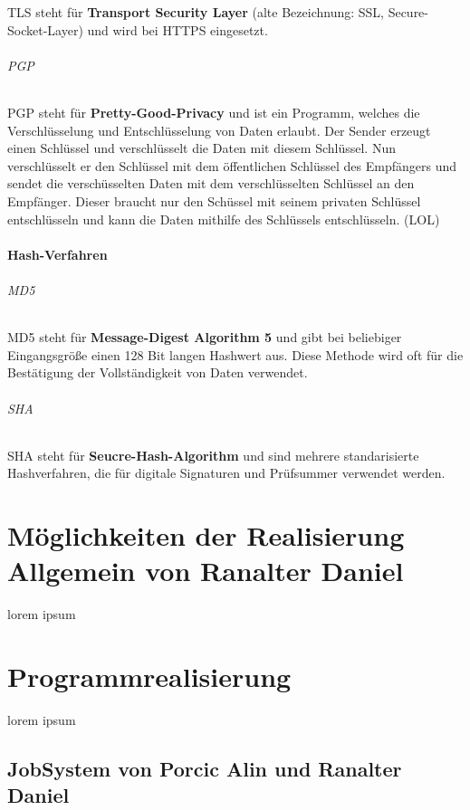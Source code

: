 \documentclass[11pt,a4paper]{report}
\begin{document}
TLS steht für \textbf{Transport Security Layer} (alte Bezeichnung: SSL, Secure-Socket-Layer) und wird bei HTTPS eingesetzt.

\paragraph{PGP}

PGP steht für \textbf{Pretty-Good-Privacy} und ist ein Programm, welches die Verschlüsselung und Entschlüsselung von Daten erlaubt. Der Sender erzeugt einen Schlüssel und verschlüsselt die Daten mit diesem Schlüssel. Nun verschlüsselt er den Schlüssel mit dem öffentlichen Schlüssel des Empfängers und sendet die verschüsselten Daten mit dem verschlüsselten Schlüssel an den Empfänger. Dieser braucht nur den Schüssel mit seinem privaten Schlüssel entschlüsseln und kann die Daten mithilfe des Schlüssels entschlüsseln. (LOL)

\subsection{Hash-Verfahren}

\paragraph{MD5}

MD5 steht für \textbf{Message-Digest Algorithm 5} und gibt bei beliebiger Eingangsgröße einen 128 Bit langen Hashwert aus. Diese Methode wird oft für die Bestätigung der Vollständigkeit von Daten verwendet.

\paragraph{SHA}

SHA steht für \textbf{Seucre-Hash-Algorithm} und sind mehrere standarisierte Hashverfahren, die für digitale Signaturen und Prüfsummer verwendet werden.

\part{Möglichkeiten der Realisierung Allgemein von Ranalter Daniel}
lorem ipsum

\part{Programmrealisierung}
lorem ipsum

\chapter{JobSystem von Porcic Alin und Ranalter Daniel}
\end{document}
